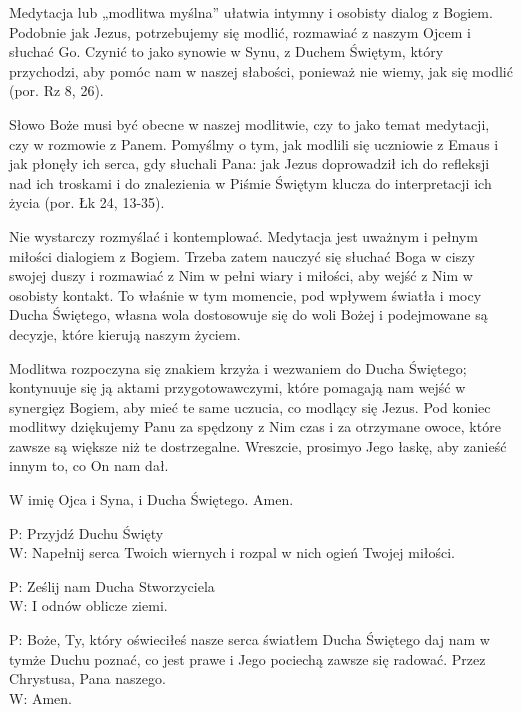 ﻿\documentclass[9pt,twoside]{extarticle}
\begin{document}
{\hnr Medytacja lub „modlitwa myślna” ułatwia intymny i osobisty dialog z Bogiem. Podobnie jak Jezus, potrzebujemy się modlić, rozmawiać z naszym Ojcem i słuchać Go. Czynić to jako synowie w Synu, z Duchem Świętym, który przychodzi, aby pomóc nam w naszej słabości, ponieważ nie wiemy, jak się modlić (por. Rz 8, 26).


Słowo Boże musi być obecne w naszej modlitwie, czy to jako temat medytacji, czy w rozmowie z Panem. Pomyślmy o tym, jak modlili się uczniowie z Emaus i jak płonęły ich serca, gdy słuchali Pana: jak Jezus doprowadził ich do refleksji nad ich troskami i do znalezienia w Piśmie Świętym klucza do interpretacji ich życia (por. Łk 24, 13-35).


Nie wystarczy rozmyślać i kontemplować. Medytacja jest uważnym i pełnym miłości dialogiem z Bogiem. Trzeba zatem nauczyć się słuchać Boga w ciszy swojej duszy i rozmawiać z Nim w pełni wiary i miłości, aby wejść z Nim w osobisty kontakt. To właśnie w tym momencie, pod wpływem światła i mocy Ducha Świętego, własna wola dostosowuje się do woli Bożej i podejmowane są decyzje, które kierują naszym życiem.


Modlitwa rozpoczyna się znakiem krzyża i wezwaniem do Ducha Świętego; kontynuuje się ją aktami przygotowawczymi, które pomagają nam wejść w synergię\linebreak z Bogiem, aby mieć te same uczucia, co modlący się Jezus. Pod koniec modlitwy dziękujemy Panu za spędzony z Nim czas i za otrzymane owoce, które zawsze są większe niż te dostrzegalne. Wreszcie, prosimy\linebreak o Jego łaskę, aby zanieść innym to, co On nam dał.}


\filbreak{}W imię Ojca i Syna, i Ducha Świętego. Amen.




{\hnr P:} Przyjdź Duchu Święty\\
{\hnr W:} Napełnij serca Twoich wiernych i rozpal w nich ogień Twojej miłości. 


{\hnr P:} Ześlij nam Ducha Stworzyciela\\
{\hnr W:} I odnów oblicze ziemi.


{\hnr P:} Boże, Ty, który oświeciłeś nasze serca światłem Ducha Świętego daj nam w tymże Duchu poznać, co jest prawe i Jego pociechą zawsze się radować. Przez Chrystusa, Pana naszego. \\
{\hnr W:} Amen.
\end{document}
